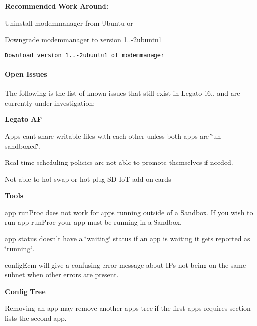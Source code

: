 {\bfseries Recommended} {\bfseries Work} {\bfseries Around\+:} 
\begin{DoxyItemize}
\item Uninstall {\ttfamily modemmanager} from Ubuntu or
\item Downgrade {\ttfamily modemmanager} to version 1..-\/2ubuntu1
\end{DoxyItemize}

\href{http://packages.ubuntu.com/trusty/modemmanager}{\tt Download version 1..-\/2ubuntu1 of modemmanager}\hypertarget{releaseNotes16103_rn16_10_3_OpenIssues}{}\paragraph{Open Issues}\label{releaseNotes16103_rn16_10_3_OpenIssues}
The following is the list of known issues that still exist in Legato 16.. and are currently under investigation\+:

{\bfseries Legato} {\bfseries AF} 
\begin{DoxyItemize}
\item Apps can\textquotesingle{}t share writable files with each other unless both apps are \char`\"{}un-\/sandboxed\char`\"{}.
\item Real time scheduling policies are not able to promote themselves if needed.
\item Not able to hot swap or hot plug SD IoT add-\/on cards
\end{DoxyItemize}

{\bfseries Tools} 
\begin{DoxyItemize}
\item {\ttfamily app} {\ttfamily run\+Proc} does not work for apps running outside of a Sandbox. If you wish to run {\ttfamily app} run\+Proc your {\ttfamily app} must be running in a Sandbox.
\item {\ttfamily app} {\ttfamily status} doesn’t have a \char`\"{}waiting\char`\"{} status if an app is waiting it gets reported as \char`\"{}running\char`\"{}.
\item {\ttfamily config\+Ecm} will give a confusing error message about IP\textquotesingle{}s not being on the same subnet when other errors are present.
\end{DoxyItemize}

{\bfseries Config} {\bfseries Tree} 
\begin{DoxyItemize}
\item Removing an {\ttfamily app} may remove another {\ttfamily apps} tree if the first {\ttfamily apps} requires section lists the second {\ttfamily app}.
\end{DoxyItemize}

